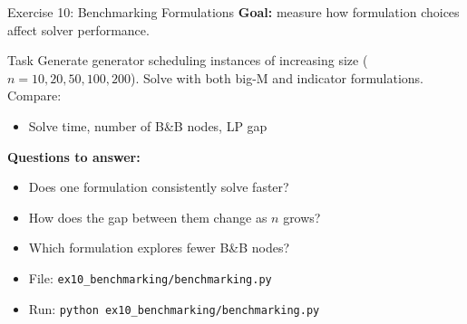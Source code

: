\documentclass[aspectratio=169,10pt]{beamer}
\begin{document}
\begin{frame}{Exercise 10: Benchmarking Formulations}
\textbf{Goal:} measure how formulation choices affect solver performance.

\medskip
\begin{block}{Task}
Generate generator scheduling instances of increasing size ($n = 10, 20, 50, 100, 200$).
Solve with both big-M and indicator formulations. Compare:
\begin{itemize}
  \item Solve time, number of B\&B nodes, LP gap
\end{itemize}
\end{block}

\medskip
\textbf{Questions to answer:}
\begin{itemize}
  \item Does one formulation consistently solve faster?
  \item How does the gap between them change as $n$ grows?
  \item Which formulation explores fewer B\&B nodes?
\end{itemize}

\medskip
\begin{itemize}
  \item File: \texttt{ex10\_benchmarking/benchmarking.py}
  \item Run: \texttt{python ex10\_benchmarking/benchmarking.py}
\end{itemize}
\end{frame}
\end{document}
